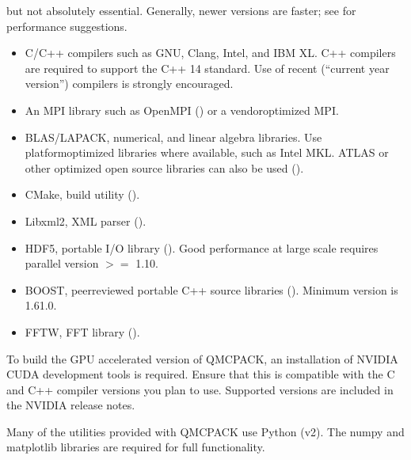 \documentclass[letterpaper,10pt,english]{sphinxmanual}
\begin{document}
 but not absolutely essential. Generally, newer versions are
faster; see {\hyperref[\detokenize{installation:buildperformance}]{}}
for performance suggestions.
\begin{itemize}
\item {} 
C/C++ compilers such as GNU, Clang, Intel, and IBM XL. C++ compilers
are required to support the C++ 14 standard. Use of recent (“current
year version”) compilers is strongly encouraged.

\item {} 
An MPI library such as OpenMPI () or a
vendor\sphinxhyphen{}optimized MPI.

\item {} 
BLAS/LAPACK, numerical, and linear algebra libraries. Use
platform\sphinxhyphen{}optimized libraries where available, such as Intel MKL.
ATLAS or other optimized open source libraries can also be used
().

\item {} 
CMake, build utility ().

\item {} 
Libxml2, XML parser ().

\item {} 
HDF5, portable I/O library (). Good
performance at large scale requires parallel version \(>=\) 1.10.

\item {} 
BOOST, peer\sphinxhyphen{}reviewed portable C++ source libraries
(). Minimum version is 1.61.0.

\item {} 
FFTW, FFT library ().

\end{itemize}

To build the GPU accelerated version of QMCPACK, an installation of
NVIDIA CUDA development tools is required. Ensure that this is
compatible with the C and C++ compiler versions you plan to use.
Supported versions are included in the NVIDIA release notes.

Many of the utilities provided with QMCPACK use Python (v2). The numpy
and matplotlib libraries are required for full functionality.
\end{document}
